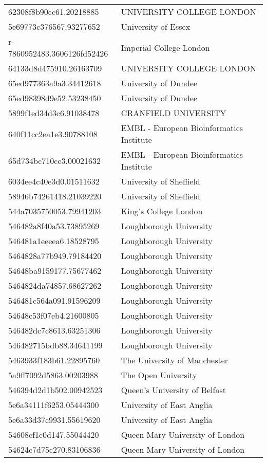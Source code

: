 \begin{tabular}{ll}
62308f8b90cc61.20218885 & UNIVERSITY COLLEGE LONDON \\
5e69773c376567.93277652 & University of Essex \\
r-7860952483.3606126fd52426 & Imperial College London \\
64133d8d475910.26163709 & UNIVERSITY COLLEGE LONDON \\
65ed977363a9a3.34412618 & University of Dundee \\
65ed98398d9e52.53238450 & University of Dundee \\
5899f1ed34d3c6.91038478 & CRANFIELD UNIVERSITY \\
640f11cc2ea1e3.90788108 & EMBL - European Bioinformatics Institute \\
65d734bc710ce3.00021632 & EMBL - European Bioinformatics Institute \\
6034ee4c40e3d0.01511632 & University of Sheffield \\
58946b74261418.21039220 & University of Sheffield \\
544a7035750053.79941203 & King's College London \\
546482a8f40a53.73895269 & Loughborough University \\
546481a1eeeea6.18528795 & Loughborough University \\
5464828a77b949.79184420 & Loughborough University \\
54648ba9159177.75677462 & Loughborough University \\
5464824da74857.68627262 & Loughborough University \\
546481c564a091.91596209 & Loughborough University \\
54648c53f07eb4.21600805 & Loughborough University \\
546482dc7c8613.63251306 & Loughborough University \\
546482715bdb88.34641199 & Loughborough University \\
5463933f183b61.22895760 & The University of Manchester \\
5a9ff7092d5863.00203988 & The Open University \\
546394d2d1b502.00942523 & Queen's University of Belfast \\
5e6a34111f6253.05444300 & University of East Anglia \\
5e6a33d37c9931.55619620 & University of East Anglia \\
54608ef1c0d147.55044420 & Queen Mary University of London \\
54624c7d75c270.83106836 & Queen Mary University of London \\

\end{tabular}
